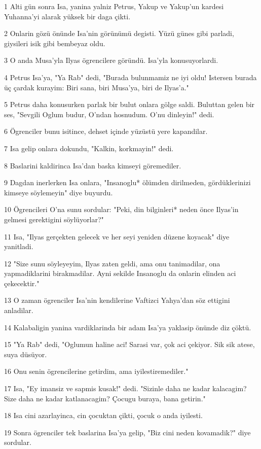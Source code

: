 \par 1 Alti gün sonra Isa, yanina yalniz Petrus, Yakup ve Yakup'un kardesi Yuhanna'yi alarak yüksek bir daga çikti.
\par 2 Onlarin gözü önünde Isa'nin görünümü degisti. Yüzü günes gibi parladi, giysileri isik gibi bembeyaz oldu.
\par 3 O anda Musa'yla Ilyas ögrencilere göründü. Isa'yla konusuyorlardi.
\par 4 Petrus Isa'ya, "Ya Rab" dedi, "Burada bulunmamiz ne iyi oldu! Istersen burada üç çardak kurayim: Biri sana, biri Musa'ya, biri de Ilyas'a."
\par 5 Petrus daha konusurken parlak bir bulut onlara gölge saldi. Buluttan gelen bir ses, "Sevgili Oglum budur, O'ndan hosnudum. O'nu dinleyin!" dedi.
\par 6 Ögrenciler bunu isitince, dehset içinde yüzüstü yere kapandilar.
\par 7 Isa gelip onlara dokundu, "Kalkin, korkmayin!" dedi.
\par 8 Baslarini kaldirinca Isa'dan baska kimseyi göremediler.
\par 9 Dagdan inerlerken Isa onlara, "Insanoglu* ölümden dirilmeden, gördüklerinizi kimseye söylemeyin" diye buyurdu.
\par 10 Ögrencileri O'na sunu sordular: "Peki, din bilginleri* neden önce Ilyas'in gelmesi gerektigini söylüyorlar?"
\par 11 Isa, "Ilyas gerçekten gelecek ve her seyi yeniden düzene koyacak" diye yanitladi.
\par 12 "Size sunu söyleyeyim, Ilyas zaten geldi, ama onu tanimadilar, ona yapmadiklarini birakmadilar. Ayni sekilde Insanoglu da onlarin elinden aci çekecektir."
\par 13 O zaman ögrenciler Isa'nin kendilerine Vaftizci Yahya'dan söz ettigini anladilar.
\par 14 Kalabaligin yanina vardiklarinda bir adam Isa'ya yaklasip önünde diz çöktü.
\par 15 "Ya Rab" dedi, "Oglumun haline aci! Sarasi var, çok aci çekiyor. Sik sik atese, suya düsüyor.
\par 16 Onu senin ögrencilerine getirdim, ama iyilestiremediler."
\par 17 Isa, "Ey imansiz ve sapmis kusak!" dedi. "Sizinle daha ne kadar kalacagim? Size daha ne kadar katlanacagim? Çocugu buraya, bana getirin."
\par 18 Isa cini azarlayinca, cin çocuktan çikti, çocuk o anda iyilesti.
\par 19 Sonra ögrenciler tek baslarina Isa'ya gelip, "Biz cini neden kovamadik?" diye sordular.
